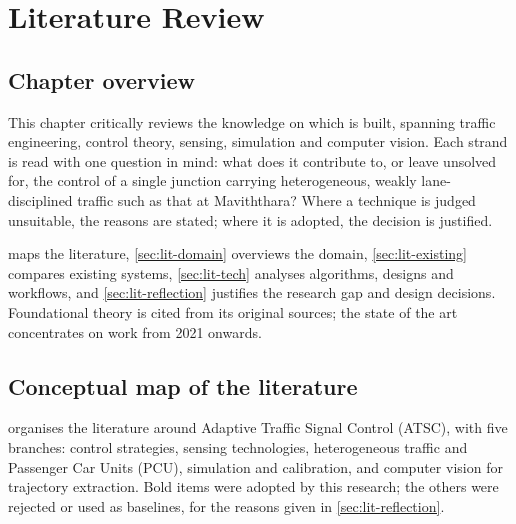 \chapter{Literature Review}\label{ch:lit}

\section{Chapter overview}\label{sec:lit-overview}
This chapter critically reviews the knowledge on which \prism{} is built, spanning traffic engineering,
control theory, sensing, simulation and computer vision. Each strand is read with one question in mind: what does
it contribute to, or leave unsolved for, the control of a single junction carrying heterogeneous, weakly
lane-disciplined traffic such as that at Maviththara? Where a technique is judged unsuitable, the reasons are
stated; where it is adopted, the decision is justified.

 maps the literature, \cref{sec:lit-domain} overviews the domain,
\cref{sec:lit-existing} compares existing systems, \cref{sec:lit-tech} analyses algorithms, designs and
workflows, and \cref{sec:lit-reflection} justifies the research gap and design decisions. Foundational theory is
cited from its original sources; the state of the art concentrates on work from 2021 onwards.

\section{Conceptual map of the literature}\label{sec:lit-conceptmap}
 organises the literature around Adaptive Traffic Signal Control (ATSC), with five
branches: control strategies, sensing technologies, heterogeneous traffic and Passenger Car Units (PCU),
simulation and calibration, and computer vision for trajectory extraction. Bold items were adopted by this
research; the others were rejected or used as baselines, for the reasons given in \cref{sec:lit-reflection}.

